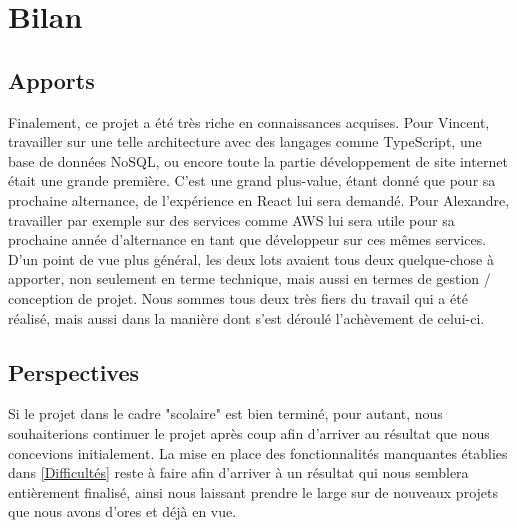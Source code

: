 \chapter{Bilan}

\section{Apports}

Finalement, ce projet a été très riche en connaissances acquises. Pour Vincent, travailler sur une telle architecture avec des langages comme TypeScript, une base de données NoSQL, ou encore toute la partie développement de site internet était une grande première. C'est une grand plus-value, étant donné que pour sa prochaine alternance, de l'expérience en React lui sera demandé. Pour Alexandre, travailler par exemple sur des services comme AWS lui sera utile pour sa prochaine année d'alternance en tant que développeur sur ces mêmes services.
D'un point de vue plus général, les deux lots avaient tous deux quelque-chose à apporter, non seulement en terme technique, mais aussi en termes de gestion / conception de projet. Nous sommes tous deux très fiers du travail qui a été réalisé, mais aussi dans la manière dont s'est déroulé l'achèvement de celui-ci. 

\section{Perspectives}

Si le projet dans le cadre "scolaire" est bien terminé, pour autant, nous souhaiterions continuer le projet après coup afin d'arriver au résultat que nous concevions initialement.
La mise en place des fonctionnalités manquantes établies dans \ref{Difficultés} reste à faire afin d'arriver à un résultat qui nous semblera entièrement finalisé, ainsi nous laissant prendre le large sur de nouveaux projets que nous avons d'ores et déjà en vue.